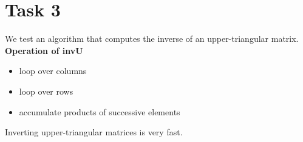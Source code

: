 
\section{Task 3}
We test an algorithm that computes the inverse of an upper-triangular matrix.\\
\textbf{Operation of invU}
\begin{itemize}
    \item loop over columns
    \item loop over rows
    \item accumulate products of successive elements
\end{itemize}

\begin{center}
\end{center}
Inverting upper-triangular matrices is very fast.
